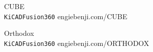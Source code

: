\documentclass[9pt]{developercv} %
\begin{document}


\begin{entrylist}
	\QRentry
		{CUBE}
		{\lorem\lorem\lorem\\ \texttt{KiCAD}\slashsep\texttt{Fusion360}}
		{engiebenji.com/CUBE}

	\QRentry
		{Orthodox}
		{\lorem\lorem\\ \texttt{KiCAD}\slashsep\texttt{Fusion360}}
		{engiebenji.com/ORTHODOX}
\end{entrylist}
\end{document}
